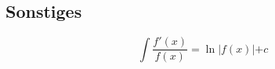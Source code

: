 \subsection{Sonstiges}

\begin{equation*}
    \int \frac{f'(x)}{f(x)} = \ln\lvert f(x)\lvert + c
\end{equation*}

